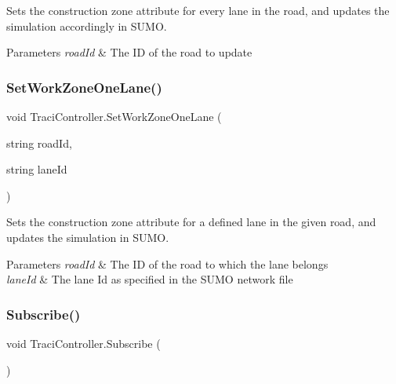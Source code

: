 Sets the construction zone attribute for every lane in the road, and updates the simulation accordingly in S\+U\+MO. 


\begin{DoxyParams}{Parameters}
{\em road\+Id} & The ID of the road to update\\
\hline
\end{DoxyParams}
\mbox{\label{class_traci_controller_a5cb4324d12175bb8007433226d988561}} 
\subsubsection{\texorpdfstring{SetWorkZoneOneLane()}{SetWorkZoneOneLane()}}
{\footnotesize\ttfamily void Traci\+Controller.\+Set\+Work\+Zone\+One\+Lane (\begin{DoxyParamCaption}\item[{string}]{road\+Id,  }\item[{string}]{lane\+Id }\end{DoxyParamCaption})}



Sets the construction zone attribute for a defined lane in the given road, and updates the simulation in S\+U\+MO. 


\begin{DoxyParams}{Parameters}
{\em road\+Id} & The ID of the road to which the lane belongs\\
\hline
{\em lane\+Id} & The lane Id as specified in the S\+U\+MO network file\\
\hline
\end{DoxyParams}
\mbox{\label{class_traci_controller_aacc5a9530481fe986ee9329f07e4eccd}} 
\subsubsection{\texorpdfstring{Subscribe()}{Subscribe()}}
{\footnotesize\ttfamily void Traci\+Controller.\+Subscribe (\begin{DoxyParamCaption}{ }\end{DoxyParamCaption})}



